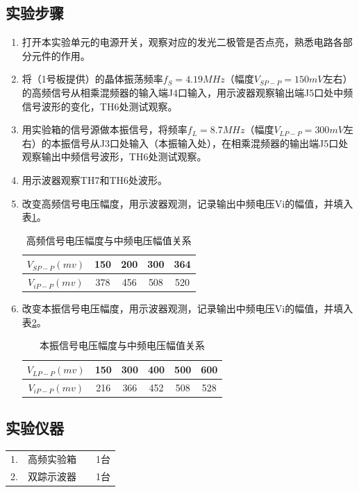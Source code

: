\documentclass[12pt]{article}%
\numberwithin{equation}{section}
\begin{document}
\subsection{实验步骤}
\begin{enumerate}\addtolength{\itemsep}{-1.5ex}
\item  打开本实验单元的电源开关，观察对应的发光二极管是否点亮，熟悉电路各部分元件的作用。
\item  将（1号板提供）的晶体振荡频率$ f_S=4.19MHz$（幅度$V_{SP-P}=150mV$左右）的高频信号从相乘混频器的输入端J4口输入，用示波器观察输出端J5口处中频信号波形的变化，TH6处测试观察。
\item  用实验箱的信号源做本振信号，将频率$f_L =8.7MHz$（幅度$V_{LP-P}=300mV$左右）的本振信号从J3口处输入（本振输入处），在相乘混频器的输出端J5口处观察输出中频信号波形，TH6处测试观察。

\item  用示波器观察TH7和TH6处波形。
\item  改变高频信号电压幅度，用示波器观测，记录输出中频电压Vi的幅值，并填入表\ref{tab:aj}。
\begin{table}[htbp]
\centering
\caption{高频信号电压幅度与中频电压幅值关系}
\label{tab:aj}
\begin{tabular}{|c|c|c|c|c|}
\hline
$V_{SP-P}(mv)$ & 150 & 200 & 300 & 364 \\ \hline
$V_{iP-P}(mv)$ & 378 & 456 & 508 & 520 \\ \hline
\end{tabular}
\end{table}
\item  改变本振信号电压幅度，用示波器观测，记录输出中频电压Vi的幅值，并填入表\ref{tab:ajk}。
\begin{table}[htbp]
\centering
\caption{本振信号电压幅度与中频电压幅值关系}
\label{tab:ajk}
\begin{tabular}{|c|c|c|c|c|c|}
\hline
$V_{LP-P}(mv)$ & 150 & 300 & 400 & 500 & 600 \\ \hline
$V_{iP-P}(mv)$ & 216 & 366 & 452 & 508 & 528 \\ \hline
\end{tabular}
\end{table}
    \end{enumerate}
\subsection{实验仪器}
\begin{tabular}{clcc}
1.&	高频实验箱                &&        1台 \\
2.&	双踪示波器           &&             1台\\
\end{tabular}
\end{document}

